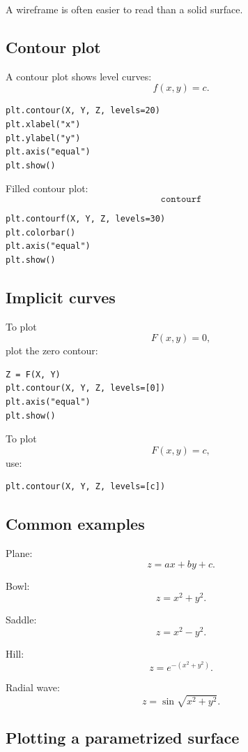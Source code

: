 A wireframe is often easier to read than a solid surface.

\subsection*{Contour plot}

A contour plot shows level curves:
\[
\boxed{
    f(x,y)=c.
}
\]

\begin{verbatim}
plt.contour(X, Y, Z, levels=20)
plt.xlabel("x")
plt.ylabel("y")
plt.axis("equal")
plt.show()
\end{verbatim}

Filled contour plot:
\[
\boxed{
    \texttt{contourf}
}
\]

\begin{verbatim}
plt.contourf(X, Y, Z, levels=30)
plt.colorbar()
plt.axis("equal")
plt.show()
\end{verbatim}

\subsection*{Implicit curves}

To plot
\[
    F(x,y)=0,
\]
plot the zero contour:

\begin{verbatim}
Z = F(X, Y)
plt.contour(X, Y, Z, levels=[0])
plt.axis("equal")
plt.show()
\end{verbatim}

To plot
\[
    F(x,y)=c,
\]
use:

\begin{verbatim}
plt.contour(X, Y, Z, levels=[c])
\end{verbatim}

\subsection*{Common examples}

Plane:
\[
\boxed{
    z=ax+by+c.
}
\]

Bowl:
\[
\boxed{
    z=x^2+y^2.
}
\]

Saddle:
\[
\boxed{
    z=x^2-y^2.
}
\]

Hill:
\[
\boxed{
    z=e^{-(x^2+y^2)}.
}
\]

Radial wave:
\[
\boxed{
    z=\sin\sqrt{x^2+y^2}.
}
\]

\subsection*{Plotting a parametrized surface}

